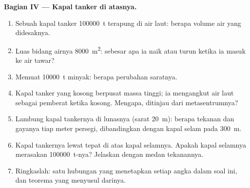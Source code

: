 \begin{problem}
\medskip
\noindent\textbf{Bagian IV --- Kapal tanker di atasnya.}
\begin{enumerate}[resume]
  \item Sebuah kapal tanker \qty{100000}{t} terapung di air laut: berapa volume air
        yang didesaknya.
  \item Luas bidang airnya \qty{8000}{m^2}: sebesar apa ia naik atau
        turun ketika ia masuk ke air tawar?
  \item Memuat \qty{10000}{t} minyak: berapa perubahan saratnya.
  \item Kapal tanker yang kosong berpusat massa tinggi; ia mengangkut air laut
        sebagai pemberat ketika kosong. Mengapa, ditinjau dari metasentrumnya?
  \item Lambung kapal tankernya di lunasnya (sarat \qty{20}{m}): berapa tekanan dan
        gayanya tiap meter persegi, dibandingkan dengan kapal selam pada
        \qty{300}{m}.
  \item Kapal tankernya lewat tepat di atas kapal selamnya. Apakah kapal
        selamnya merasakan \qty{100000}{t}-nya? Jelaskan dengan medan
        tekanannya.
  \item Ringkaslah: satu hubungan yang menetapkan setiap angka dalam
        soal ini, dan teorema yang menyusul darinya.
\end{enumerate}
\end{problem}
